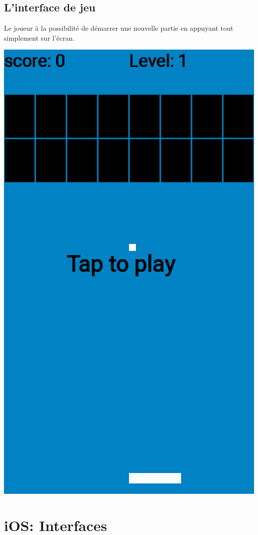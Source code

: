 \documentclass[a4paper]{article}
\begin{document}
\subsection{L'interface de jeu}
Le joueur à la possibilité de démarrer une nouvelle partie en appuyant tout simplement sur l'écran.
\begin{center}
  \includegraphics[scale=0.20]{images/3.png}
\end{center}

\newpage
\section{iOS: Interfaces}
\end{document}
